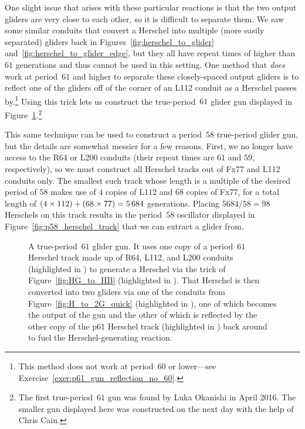 One slight issue that arises with these particular reactions is that the two output gliders are very close to each other, so it is difficult to separate them. We saw some similar conduits that convert a Herschel into multiple (more easily separated) gliders back in Figures~\ref{fig:herschel_to_glider} and~\ref{fig:herschel_to_glider_edge}, but they all have repeat times of higher than $61$ generations and thus cannot be used in this setting. One method that \emph{does} work at period~$61$ and higher to separate these closely-spaced output gliders is to reflect one of the gliders off of the corner of an L112 conduit as a Herschel passes by.\footnote{This method does not work at period~$60$ or lower---see Exercise~\ref{exer:p61_gun_reflection_no_60}.} Using this trick lets us construct the true-period~$61$ glider gun displayed in Figure~\ref{fig:p61_gun}.\footnote{The first true-period~$61$ gun was found by Luka Okanishi in April 2016. The smaller gun displayed here was constructed on the next day with the help of Chris Cain.}

This same technique can be used to construct a period~$58$ true-period glider gun, but the details are somewhat messier for a few reasons. First, we no longer have access to the R64 or L200 conduits (their repeat times are $61$ and $59$, respectively), so we must construct all Herschel tracks out of Fx77 and L112 conduits only. The smallest such track whose length is a multiple of the desired period of $58$ makes use of $4$ copies of L112 and $68$ copies of Fx77, for a total length of $(4 \times 112) + (68 \times 77) = 5{\,}684$ generations. Placing $5684/58 = 98$ Herschels on this track results in the period~$58$ oscillator displayed in Figure~\ref{fig:p58_herschel_track} that we can extract a glider from.

\begin{figure}[!htb]
	\centering
	\caption{A true-period~$61$ glider gun. It uses one copy of a period~$61$ Herschel track made up of R64, L112, and L200 conduits (highlighted in ) to generate a Herschel via the trick of Figure~\ref{fig:HG_to_HB} (highlighted in ). That Herschel is then converted into two gliders via one of the conduits from Figure~\ref{fig:H_to_2G_quick} (highlighted in ), one of which becomes the output of the gun and the other of which is reflected by the other copy of the p$61$ Herschel track (highlighted in ) back around to fuel the Herschel-generating reaction.}\label{fig:p61_gun}
\end{figure}

